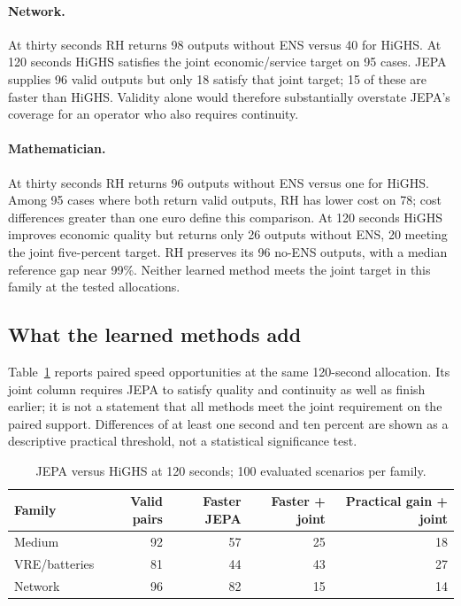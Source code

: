 \paragraph{Network.}
At thirty seconds RH returns 98 outputs without ENS versus 40 for HiGHS.
At 120 seconds HiGHS satisfies the joint economic/service target on 95 cases.
JEPA supplies 96 valid outputs but only 18 satisfy that joint target;
15 of these are faster than HiGHS. Validity alone would therefore substantially
overstate JEPA's coverage for an operator who also requires continuity.

\paragraph{Mathematician.}
At thirty seconds RH returns 96 outputs without ENS versus one for HiGHS.
Among 95 cases where both return valid outputs, RH has lower cost on 78;
cost differences greater than one euro define this comparison. At 120 seconds
HiGHS improves economic quality but returns only 26 outputs without ENS,
20 meeting the joint five-percent target. RH preserves its 96 no-ENS outputs,
with a median reference gap near 99\%. Neither learned method meets the
joint target in this family at the tested allocations.

\subsection{What the learned methods add}
Table~\ref{tab:jepa_final} reports paired speed opportunities at the same
120-second allocation. Its joint column requires JEPA to satisfy quality and
continuity as well as finish earlier; it is not a statement that all methods
meet the joint requirement on the paired support. Differences of at least
one second and ten percent are shown as a descriptive practical threshold,
not a statistical significance test.
\begin{table}[htbp]\centering\small
\caption{JEPA versus HiGHS at 120 seconds; 100 evaluated scenarios per family.}
\label{tab:jepa_final}
\begin{tabular}{lrrrr}\toprule
Family & Valid pairs & Faster JEPA & Faster + joint & Practical gain + joint\\\midrule
Medium & 92 & 57 & 25 & 18\\
VRE/batteries & 81 & 44 & 43 & 27\\
Network & 96 & 82 & 15 & 14\\\bottomrule
\end{tabular}
\end{table}

